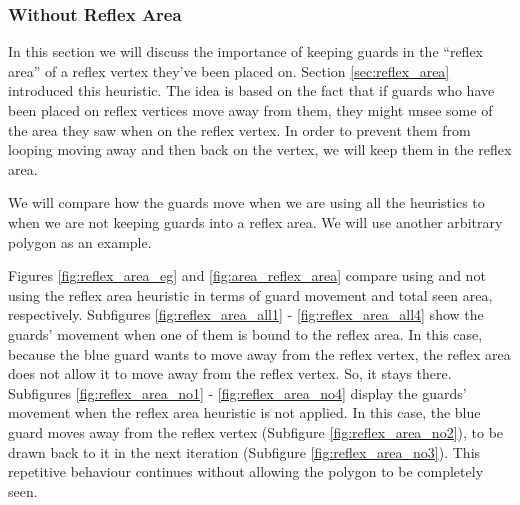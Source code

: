 \subsubsection{Without Reflex Area}
In this section we will discuss the importance of keeping guards in the ``reflex area'' of a reflex vertex they've been placed on. Section \ref{sec:reflex_area} introduced this heuristic. The idea is based on the fact that if guards who have been placed on reflex vertices move away from them, they might unsee some of the area they saw when on the reflex vertex. In order to prevent them from looping moving away and then back on the vertex, we will keep them in the reflex area.

We will compare how the guards move when we are using all the heuristics to when we are not keeping guards into a reflex area. We will use another arbitrary polygon as an example.

Figures \ref{fig:reflex_area_eg} and \ref{fig:area_reflex_area} compare using and not using the reflex area heuristic in terms of guard movement and total seen area, respectively. Subfigures \ref{fig:reflex_area_all1} - \ref{fig:reflex_area_all4} show the guards' movement when one of them is bound to the reflex area. In this case, because the blue guard wants to move away from the reflex vertex, the reflex area does not allow it to move away from the reflex vertex. So, it stays there. 
Subfigures \ref{fig:reflex_area_no1} - \ref{fig:reflex_area_no4} display the guards' movement when the reflex area heuristic is not applied. In this case, the blue guard moves away from the reflex vertex (Subfigure \ref{fig:reflex_area_no2}), to be drawn back to it in the next iteration (Subfigure \ref{fig:reflex_area_no3}). This repetitive behaviour continues without allowing the polygon to be completely seen.

